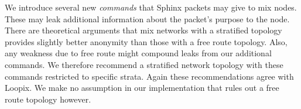 We introduce several new {\em commands} that Sphinx packets may give
to mix nodes.  These may leak additional information about the
packet's purpose to the node.  There are theoretical arguments that 
mix networks with a stratified topology provides slightly better
anonymity than those with a free route topology.  Also, any weakness
due to free route might compound leaks from our additional commands. 
We therefore recommend a stratified network topology with these
commands restricted to specific strata.  Again these recommendations
agree with Loopix.  We make no assumption in our implementation that
rules out a free route topology however.  



